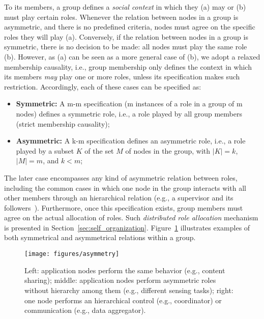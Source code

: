 To its members, a group defines a \textit{social context} in which they (a) may or (b) must play certain roles. Whenever the relation between nodes in a group is asymmetric, and there is no predefined criteria, nodes must agree on the specific roles they will play (a). Conversely, if the relation between nodes in a group is symmetric, there is no decision to be made: all nodes must play the same role (b). However, as (a) can be seen as a more general case of (b), we adopt a relaxed membership causality, i.e., group membership only defines the context in which its members \textit{may} play one or more roles, unless its specification makes such restriction. Accordingly, each of these cases can be specified as:

\begin{itemize}
	
	\item \textbf{Symmetric:} A m-m specification (m instances of a role in a group of m nodes) defines a symmetric role, i.e., a role played by all group members (strict membership causality);
	
	\item \textbf{Asymmetric:} A k-m specification defines an asymmetric role, i.e., a role played by a subset $K$ of the set $M$ of nodes in the group, with $|K| = k$, $|M| = m$, and $k < m$;
	
	
\end{itemize}


The later case encompasses any kind of asymmetric relation between roles, including the common cases in which one node in the group interacts with all other members through an hierarchical relation (e.g., a supervisor and its followers~\cite{}). Furthermore, once this specification exists, group members must agree on the actual allocation of roles. Such \textit{distributed role allocation} mechanism is presented in Section~\ref{sec:self_organization}. Figure~\ref{fig:asymmetry} illustrates examples of both symmetrical and asymmetrical relations within a group. 

\begin{figure}[t!]
	\centering
	\texttt{[image: figures/asymmetry]}
	\caption{Left: application nodes perform the same behavior (e.g., content sharing); middle: application nodes perform asymmetric roles without hierarchy among them (e.g., different sensing tasks); right: one node performs an hierarchical control (e.g., coordinator) or communication (e.g., data aggregator).}
	\label{fig:asymmetry}
\end{figure}


